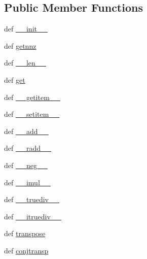 \subsection*{Public Member Functions}
\begin{DoxyCompactItemize}
\item 
def \hyperlink{classscipy_1_1sparse_1_1dok_1_1dok__matrix_a394311b03f1efc0cdac492468b9417f7}{\+\_\+\+\_\+init\+\_\+\+\_\+}
\item 
def \hyperlink{classscipy_1_1sparse_1_1dok_1_1dok__matrix_a17e3c30cd530ec52f6e79cf703de6e5f}{getnnz}
\item 
def \hyperlink{classscipy_1_1sparse_1_1dok_1_1dok__matrix_a47a897bbc6cf37e415e7755e549e4a98}{\+\_\+\+\_\+len\+\_\+\+\_\+}
\item 
def \hyperlink{classscipy_1_1sparse_1_1dok_1_1dok__matrix_ad881c95567aabde9e386020001da8e1f}{get}
\item 
def \hyperlink{classscipy_1_1sparse_1_1dok_1_1dok__matrix_a1eb7f89fdd392af4b747d96e1c0e803d}{\+\_\+\+\_\+getitem\+\_\+\+\_\+}
\item 
def \hyperlink{classscipy_1_1sparse_1_1dok_1_1dok__matrix_a8ae73a9ccde6dac186dbb988540081a8}{\+\_\+\+\_\+setitem\+\_\+\+\_\+}
\item 
def \hyperlink{classscipy_1_1sparse_1_1dok_1_1dok__matrix_aa75f7501e8d28e9575ddc334084b69d5}{\+\_\+\+\_\+add\+\_\+\+\_\+}
\item 
def \hyperlink{classscipy_1_1sparse_1_1dok_1_1dok__matrix_a77257b7de442338f5bc228e7abcb900b}{\+\_\+\+\_\+radd\+\_\+\+\_\+}
\item 
def \hyperlink{classscipy_1_1sparse_1_1dok_1_1dok__matrix_a23e50afab75ad6c34b88f6419c1064a2}{\+\_\+\+\_\+neg\+\_\+\+\_\+}
\item 
def \hyperlink{classscipy_1_1sparse_1_1dok_1_1dok__matrix_a85f4012e61dd787bfa5a5bfca3056569}{\+\_\+\+\_\+imul\+\_\+\+\_\+}
\item 
def \hyperlink{classscipy_1_1sparse_1_1dok_1_1dok__matrix_a9638831e9b2a6f57465e9435f05bd9e5}{\+\_\+\+\_\+truediv\+\_\+\+\_\+}
\item 
def \hyperlink{classscipy_1_1sparse_1_1dok_1_1dok__matrix_a9810564d40470abb468d23a61633431d}{\+\_\+\+\_\+itruediv\+\_\+\+\_\+}
\item 
def \hyperlink{classscipy_1_1sparse_1_1dok_1_1dok__matrix_a18fd2e752e34a47090d7a2e11a6a913e}{transpose}
\item 
def \hyperlink{classscipy_1_1sparse_1_1dok_1_1dok__matrix_ade8f7f3dd1eebf7c16cd57b4054bea2a}{conjtransp}
\item 

\end{DoxyCompactItemize}
